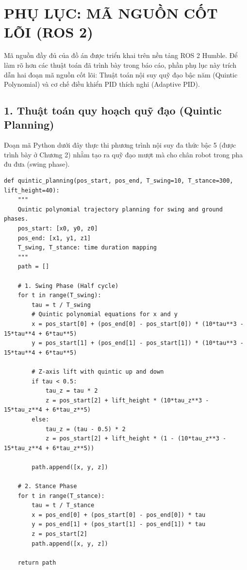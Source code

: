 \chapter*{PHỤ LỤC: MÃ NGUỒN CỐT LÕI (ROS 2)}

Mã nguồn đầy đủ của đồ án được triển khai trên nền tảng ROS 2 Humble. Để làm rõ hơn các thuật toán đã trình bày trong báo cáo, phần phụ lục này trích dẫn hai đoạn mã nguồn cốt lõi: Thuật toán nội suy quỹ đạo bậc năm (Quintic Polynomial) và cơ chế điều khiển PID thích nghi (Adaptive PID).

\section*{1. Thuật toán quy hoạch quỹ đạo (Quintic Planning)}

Đoạn mã Python dưới đây thực thi phương trình nội suy đa thức bậc 5 (được trình bày ở Chương 2) nhằm tạo ra quỹ đạo mượt mà cho chân robot trong pha đu đưa (swing phase).

\begin{verbatim}
def quintic_planning(pos_start, pos_end, T_swing=10, T_stance=300, lift_height=40):
    """
    Quintic polynomial trajectory planning for swing and ground phases.
    pos_start: [x0, y0, z0]
    pos_end: [x1, y1, z1]
    T_swing, T_stance: time duration mapping
    """
    path = []
    
    # 1. Swing Phase (Half cycle)
    for t in range(T_swing):
        tau = t / T_swing
        # Quintic polynomial equations for x and y
        x = pos_start[0] + (pos_end[0] - pos_start[0]) * (10*tau**3 - 15*tau**4 + 6*tau**5)
        y = pos_start[1] + (pos_end[1] - pos_start[1]) * (10*tau**3 - 15*tau**4 + 6*tau**5)
        
        # Z-axis lift with quintic up and down
        if tau < 0.5:
            tau_z = tau * 2
            z = pos_start[2] + lift_height * (10*tau_z**3 - 15*tau_z**4 + 6*tau_z**5)
        else:
            tau_z = (tau - 0.5) * 2
            z = pos_start[2] + lift_height * (1 - (10*tau_z**3 - 15*tau_z**4 + 6*tau_z**5))
            
        path.append([x, y, z])
        
    # 2. Stance Phase
    for t in range(T_stance):
        tau = t / T_stance
        x = pos_end[0] + (pos_start[0] - pos_end[0]) * tau
        y = pos_end[1] + (pos_start[1] - pos_end[1]) * tau
        z = pos_start[2]
        path.append([x, y, z])
        
    return path
\end{verbatim}

